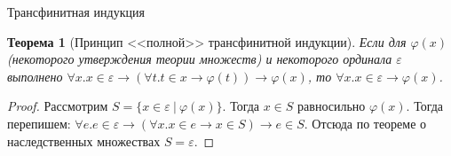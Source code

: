 \documentclass[handout]{beamer}
\newtheorem{thm}{Теорема}[section]
\begin{document}
\begin{frame}{Трансфинитная индукция}
\begin{thm}[Принцип <<полной>> трансфинитной индукции] Если для $\varphi(x)$ (некоторого утверждения
теории множеств) и некоторого ординала $\varepsilon$ выполнено
$\forall x.x \in \varepsilon \rightarrow (\forall t.t \in x \rightarrow \varphi(t)) \rightarrow \varphi(x)$,
то $\forall x.x \in \varepsilon \rightarrow \varphi(x)$.
\end{thm}
\begin{proof}Рассмотрим $S = \{ x\in \varepsilon\ |\ \varphi(x) \}$. Тогда $x \in S$ равносильно $\varphi(x)$.
Тогда перепишем: $\forall e.e \in \varepsilon \rightarrow (\forall x.x \in e \rightarrow x \in S) \rightarrow e \in S$.
Отсюда по теореме о наследственных множествах $S = \varepsilon$.\end{proof}
\end{frame}
\end{document}
